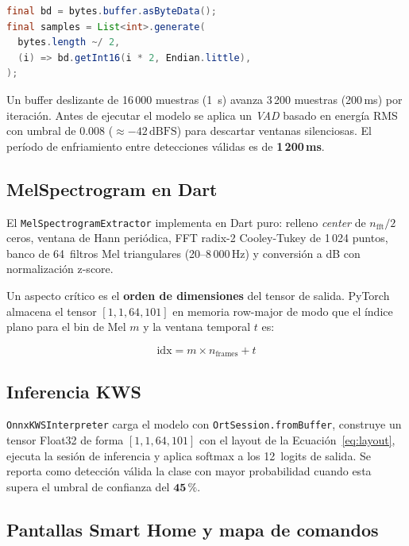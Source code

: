 \documentclass[conference]{IEEEtran}
\begin{document}
\begin{lstlisting}[language=Java]
final bd = bytes.buffer.asByteData();
final samples = List<int>.generate(
  bytes.length ~/ 2,
  (i) => bd.getInt16(i * 2, Endian.little),
);
\end{lstlisting}

Un buffer deslizante de 16\,000 muestras (1~s) avanza 3\,200 muestras
(200\,ms) por iteración.  Antes de ejecutar el modelo se aplica un \textit{VAD}
basado en energía RMS con umbral de $0.008$ (\(\approx -42\,\text{dBFS}\)) para
descartar ventanas silenciosas.  El período de enfriamiento entre detecciones
válidas es de \textbf{1\,200\,ms}.

\subsection{MelSpectrogram en Dart}

El \texttt{MelSpectrogramExtractor} implementa en Dart puro: relleno
\textit{center} de $n_\text{fft}/2$ ceros, ventana de Hann periódica, FFT
radix-2 Cooley-Tukey de 1\,024 puntos, banco de 64~filtros Mel triangulares
(20--8\,000\,Hz) y conversión a dB con normalización z-score.

Un aspecto crítico es el \textbf{orden de dimensiones} del tensor de salida.
PyTorch almacena el tensor $[1, 1, 64, 101]$ en memoria row-major de modo que
el índice plano para el bin de Mel $m$ y la ventana temporal $t$ es:

\begin{equation}
  \text{idx} = m \times n_\text{frames} + t
  \label{eq:layout}
\end{equation}

\subsection{Inferencia KWS}

\texttt{OnnxKWSInterpreter} carga el modelo con \texttt{OrtSession.fromBuffer},
construye un tensor Float32 de forma $[1,1,64,101]$ con el layout de la
Ecuación~\eqref{eq:layout}, ejecuta la sesión de inferencia y aplica softmax
a los 12~logits de salida.  Se reporta como detección válida la clase con mayor
probabilidad cuando esta supera el umbral de confianza del $\mathbf{45\,\%}$.

\subsection{Pantallas Smart Home y mapa de comandos}
\end{document}
